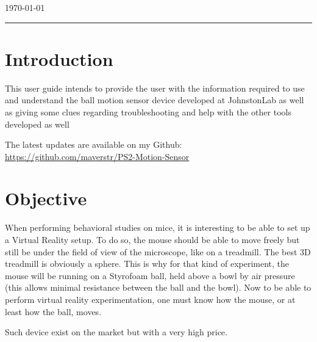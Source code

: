 \documentclass[a4paper]{article}
\begin{document}
\begin{titlepage}

{\large \today}\\[2cm] %


\vfill %

\end{titlepage}


\noindent\rule{\textwidth}{1pt}

\tableofcontents

\newpage

\listoffigures

\newpage



\section{Introduction}
This user guide intends to provide the user with the information required to use and understand the ball motion sensor device developed at JohnstonLab as well as giving some clues regarding troubleshooting and help with the other tools developed as well

The latest updates are available on my Github: \url{https://github.com/maverstr/PS2-Motion-Sensor}

\section{Objective}
When performing behavioral studies on mice, it is interesting to be able to set up a Virtual Reality setup. To do so, the mouse should be able to move freely but still be under the field of view of the microscope, like on a treadmill. The best 3D treadmill is obviously a sphere. 
This is why for that kind of experiment, the mouse will be running on a Styrofoam ball, held above a bowl by air pressure (this allows minimal resistance between the ball and the bowl).
Now to be able to perform virtual reality experimentation, one must know how the mouse, or at least how the ball, moves.

Such device exist on the market but with a very high price.
\end{document}
